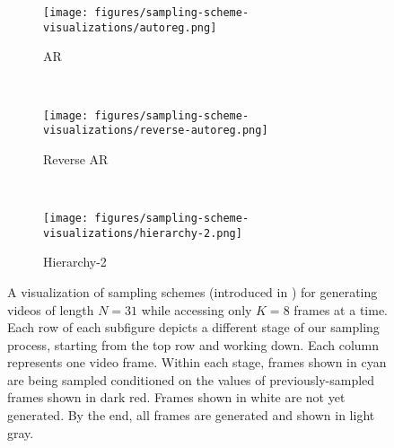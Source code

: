 \begin{figure}[t]
    \centering
    \begin{subfigure}[t]{0.3\textwidth}
        \centering
        \texttt{[image: figures/sampling-scheme-visualizations/autoreg.png]}
        \caption{AR}
        \label{fig:ar}
    \end{subfigure}
    ~
    \begin{subfigure}[t]{0.3\textwidth}
        \centering
        \texttt{[image: figures/sampling-scheme-visualizations/reverse-autoreg.png]}
        \caption{Reverse AR}
        \label{fig:rev_ar}
    \end{subfigure}
    ~
    \begin{subfigure}[t]{0.3\textwidth}
        \centering
        \texttt{[image: figures/sampling-scheme-visualizations/hierarchy-2.png]}
        \caption{Hierarchy-2}
        \label{fig:h2}
    \end{subfigure}
    \caption[A visualization of sampling schemes introduced in prior work.]{A visualization of sampling schemes (introduced in \citet{fdm}) for generating videos of length $N=31$ while accessing only $K=8$ frames at a time. Each row of each subfigure depicts a different stage of our sampling process, starting from the top row and working down. Each column represents one video frame. Within each stage, frames shown in \textcolor{latentcolor}{cyan} are being sampled conditioned on the values of previously-sampled frames shown in \textcolor{observedpastcolor}{dark red}. Frames shown in white are not yet generated. By the end, all frames are generated and shown in \textcolor{completecolor}{light gray}.
    }
    \label{fig:old-sampling-schemes}
\end{figure}







